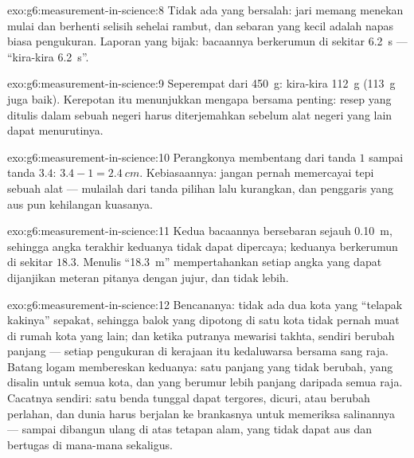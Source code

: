 \begin{solution}{exo:g6:measurement-in-science:8}
Tidak ada yang bersalah: jari memang menekan mulai dan berhenti
selisih sehelai rambut, dan sebaran yang kecil adalah napas biasa
pengukuran. Laporan yang bijak: bacaannya berkerumun di sekitar
\qty{6.2}{s} --- ``kira-kira \qty{6.2}{s}''.
\end{solution}

\begin{solution}{exo:g6:measurement-in-science:9}
Seperempat dari \qty{450}{g}: kira-kira \qty{112}{g} (\qty{113}{g}
juga baik). Kerepotan itu menunjukkan mengapa  bersama penting:
resep yang ditulis dalam  sebuah negeri harus diterjemahkan
sebelum alat negeri yang lain dapat menurutinya.
\end{solution}

\begin{solution}{exo:g6:measurement-in-science:10}
Perangkonya membentang dari tanda $1$ sampai tanda $3.4$: $3.4 - 1 =
\qty{2.4}{cm}$. Kebiasaannya: jangan pernah memercayai tepi sebuah
alat --- mulailah dari tanda pilihan lalu kurangkan, dan penggaris
yang aus pun kehilangan kuasanya.
\end{solution}

\begin{solution}{exo:g6:measurement-in-science:11}
Kedua bacaannya bersebaran sejauh \qty{0.10}{m}, sehingga angka
terakhir keduanya tidak dapat dipercaya; keduanya berkerumun di
sekitar $18.3$. Menulis ``\qty{18.3}{m}'' mempertahankan setiap angka
yang dapat dijanjikan meteran pitanya dengan jujur, dan tidak lebih.
\end{solution}

\begin{solution}{exo:g6:measurement-in-science:12}
Bencananya: tidak ada dua kota yang ``telapak kakinya'' sepakat,
sehingga balok yang dipotong di satu kota tidak pernah muat di rumah
kota yang lain; dan ketika putranya mewarisi takhta,  sendiri
berubah panjang --- setiap pengukuran di kerajaan itu kedaluwarsa
bersama sang raja. Batang logam membereskan keduanya: satu panjang
yang tidak berubah, yang disalin untuk semua kota, dan yang berumur
lebih panjang daripada semua raja. Cacatnya sendiri: satu benda
tunggal dapat tergores, dicuri, atau berubah perlahan, dan dunia harus
berjalan ke brankasnya untuk memeriksa salinannya --- sampai 
dibangun ulang di atas tetapan alam, yang tidak dapat aus dan bertugas
di mana-mana sekaligus.
\end{solution}

